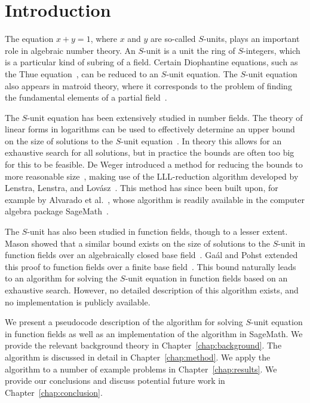 
\chapter{Introduction}%
\label{chap:introduction}

The equation \(x + y = 1\), where \(x\) and \(y\) are so-called \(S\)-units, plays an important role in algebraic number theory. An \(S\)-unit is a unit the ring of \(S\)-integers, which is a particular kind of subring of a field. Certain Diophantine equations, such as the Thue equation~\cite{thue-1909-uber-annaherungsweerte-algebraischer}, can be reduced to an \(S\)-unit equation. The \(S\)-unit equation also appears in matroid theory, where it corresponds to the problem of finding the fundamental elements of a partial field~\cite{zwam-2009-partial-fields-in}.

The \(S\)-unit equation has been extensively studied in number fields. The theory of linear forms in logarithms can be used to effectively determine an upper bound on the size of solutions to the \(S\)-unit equation~\cite{gyory-1979-on-the-number}. In theory this allows for an exhaustive search for all solutions, but in practice the bounds are often too big for this to be feasible. De Weger introduced a method for reducing the bounds to more reasonable size~\cite{weger-1989-algorithms-for-diophantine}, making use of the LLL-reduction algorithm developed by Lenstra, Lenstra, and Lov\'{a}sz~\cite{lenstra-1982-factoring-polynomials-with}. This method has since been built upon, for example by Alvarado et al.~\cite{alvarado-2021-a-robust-implementation}, whose algorithm is readily available in the computer algebra package SageMath~\cite{sagemath}.

The \(S\)-unit has also been studied in function fields, though to a lesser extent. Mason showed that a similar bound exists on the size of solutions to the \(S\)-unit in function fields over an algebraically closed base field~\cite{mason-1984-diophantine-equations-over}. Ga\'{a}l and Pohst extended this proof to function fields over a finite base field~\cite{gaal-2006-diophantine-equations-over}. This bound naturally leads to an algorithm for solving the \(S\)-unit equation in function fields based on an exhaustive search. However, no detailed description of this algorithm exists, and no implementation is publicly available.

We present a pseudocode description of the algorithm for solving \(S\)-unit equation in function fields as well as an implementation of the algorithm in SageMath. We provide the relevant background theory in Chapter~\ref{chap:background}. The algorithm is discussed in detail in Chapter~\ref{chap:method}. We apply the algorithm to a number of example problems in Chapter~\ref{chap:results}. We provide our conclusions and discuss potential future work in Chapter~\ref{chap:conclusion}.
